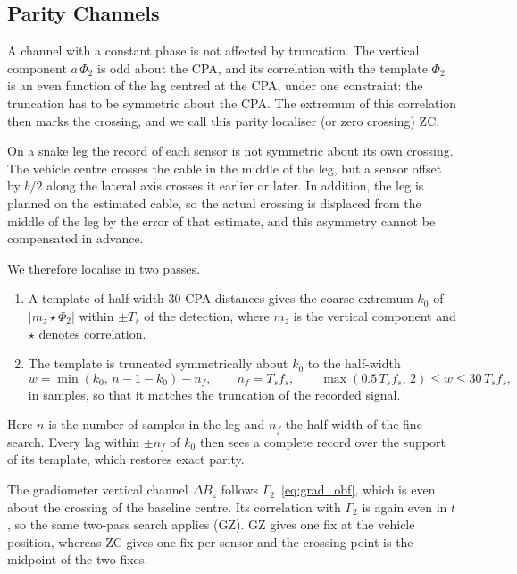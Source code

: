 \subsection{Parity Channels}\label{subsec:parity_channels}

A channel with a constant phase is not affected by truncation. The vertical component $a\,\Phi_2$ is odd about the CPA, and its correlation with the template $\Phi_2$ is an even function of the lag centred at the CPA, under one constraint: the truncation has to be symmetric about the CPA. The extremum of this correlation then marks the crossing, and we call this parity localiser (or zero crossing) ZC.

On a snake leg the record of each sensor is not symmetric about its own crossing. The vehicle centre crosses the cable in the middle of the leg, but a sensor offset by $b/2$ along the lateral axis crosses it earlier or later. In addition, the leg is planned on the estimated cable, so the actual crossing is displaced from the middle of the leg by the error of that estimate, and this asymmetry cannot be compensated in advance.

We therefore localise in two passes.
\begin{enumerate}
\item A template of half-width 30 CPA distances gives the coarse extremum $k_0$ of $|m_z \star \Phi_2|$ within $\pm T_s$ of the detection, where $m_z$ is the vertical component and $\star$ denotes correlation.
\item The template is truncated symmetrically about $k_0$ to the half-width
\begin{equation}
w = \min(k_0,\, n-1-k_0) - n_f, \qquad n_f = T_s f_s, \qquad \max(0.5\,T_s f_s,\, 2) \leq w \leq 30\,T_s f_s,
\label{eq:parity_window}
\end{equation}
in samples, so that it matches the truncation of the recorded signal.
\end{enumerate}
Here $n$ is the number of samples in the leg and $n_f$ the half-width of the fine search. Every lag within $\pm n_f$ of $k_0$ then sees a complete record over the support of its template, which restores exact parity.

The gradiometer vertical channel $\Delta B_z$ follows $\Gamma_2$~\eqref{eq:grad_obf}, which is even about the crossing of the baseline centre. Its correlation with $\Gamma_2$ is again even in $t$, so the same two-pass search applies (GZ). GZ gives one fix at the vehicle position, whereas ZC gives one fix per sensor and the crossing point is the midpoint of the two fixes.
